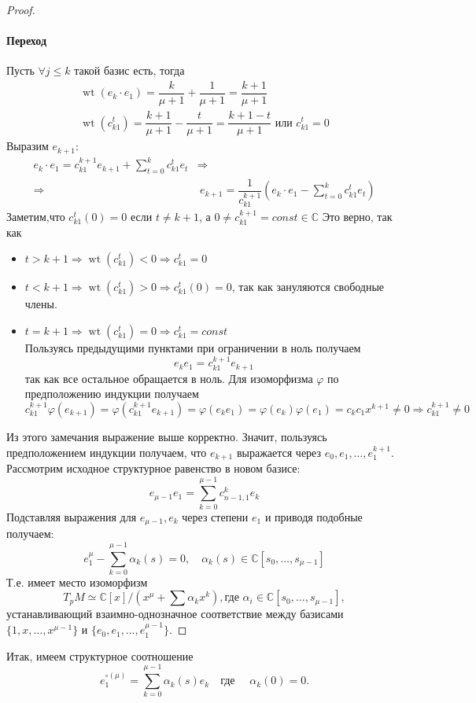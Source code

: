 \begin{proof}
	\paragraph{Переход}
	Пусть \(\forall j \leq k\) такой базис есть, тогда 
	\begin{gather*}
		\operatorname{wt}(e_k\cdot e_1) = \dfrac{k}{\mu + 1} + \dfrac{1}{\mu + 1} = \dfrac{k + 1}{\mu + 1}\\
		\operatorname{wt}(c^t_{k1}) = \dfrac{k+1}{\mu+1} - \dfrac{t}{\mu +1} = \dfrac{k+1-t}{\mu + 1} \text{ или } c^t_{k1} = 0
	\end{gather*}
	Выразим \(e_{k+1}\): 
	\begin{align*}
		e_k \cdot e_1 = c_{k1}^{k+1} e_{k+1} + \sum^k_{t = 0} c^t_{k1} e_t &\Rightarrow\\
		\Rightarrow & \hspace{3pt}e_{k+1} = \dfrac{1}{c_{k1}^{k+1}} \left( e_k\cdot e_1  - \sum^k_{t = 0} c^t_{k1} e_t \right)
	\end{align*}
	Заметим,что 
	\(c^t_{k1}(0) = 0\) если \(t \neq k+1\), а \(0 \neq c^{k+1}_{k1} = const \in \mathbb{C}\)
	Это верно, так как 
	\begin{itemize}
		\item \(t > k+1 \Rightarrow\operatorname{wt}(c^t_{k1}) < 0 \Rightarrow  c^t_{k1} = 0\)
		\item \(t < k+1 \Rightarrow\operatorname{wt}(c^t_{k1}) > 0 \Rightarrow c^t_{k1}(0) = 0\), так как зануляются свободные члены.
		\item \(t = k+1 \Rightarrow\operatorname{wt}(c^t_{k1}) = 0 \Rightarrow c^t_{k1} = const\)\\
		Пользуясь предыдущими пунктами при ограничении в ноль получаем \[e_ke_1 = c_{k1}^{k+1}e_{k+1}\] так как все остальное обращается в ноль. Для изоморфизма \(\varphi\) по предположению индукции получаем 
		\[c_{k1}^{k+1}\varphi(e_{k+1}) = \varphi(c_{k1}^{k+1}e_{k+1}) =\varphi(e_ke_1) = \varphi(e_k)\varphi(e_1) = c_kc_1x^{k+1} \neq 0 \Rightarrow c_{k1}^{k+1} \neq 0\]
	\end{itemize}
	Из этого замечания выражение выше корректно. Значит, пользуясь предположением индукции получаем, что \(e_{k+1}\) выражается через \(e_0, e_1, \dots, e_1^{k+1}\).\\
	Рассмотрим исходное структурное равенство в новом базисе:
	\[e_{\mu-1} e_1 = \sum_{k = 0}^{\mu -1} c^k_{n-1,1} e_k\]
	Подставляя выражения для \(e_{\mu -1}, e_k\) через степени \(e_1\) и приводя подобные получаем: \[e_1^{\mu}- \sum^{\mu -1}_{k = 0}\alpha_k(s) = 0, \quad \alpha_k(s) \in \mathbb{C}[s_0, \dots, s_{\mu-1}]\]
	Т.е. имеет место изоморфизм
	\[T_pM \simeq \mathbb{C}[x]/(x^{\mu} + \sum \alpha_k x^k), \text{где } \alpha_i \in \mathbb{C}[s_0, \dots, s_{\mu-1}],\] устанавливающий взаимно-однозначное соответствие между базисами \(\{1, x, \dots, x^{\mu-1}\}\) и \(\{e_0, e_1, \dots, e^{\mu-1}_1\}\).
\end{proof}
Итак, имеем структурное соотношение 
\begin{equation}
	e_1^{\circ(\mu)}
	=
	\sum_{k=0}^{\mu-1}\alpha_k(s)e_k \quad \text{где } \quad \alpha_k(0)=0.
	\label{eq:fundamental_relation} 
\end{equation}
